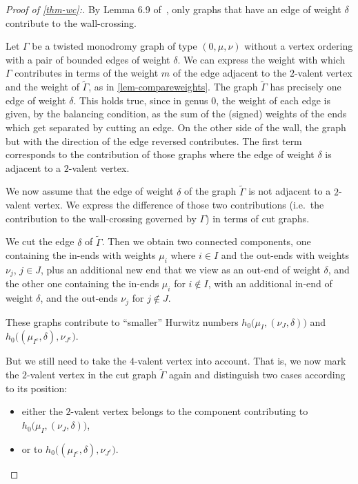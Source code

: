 \documentclass[ALCO,published]{cedram}
\begin{document}
\begin{proof}[Proof of \cref{thm-wc}:]
By Lemma 6.9 of~\cite{CJM10}, only graphs that have an edge of weight $\delta$ contribute to the wall-crossing.

Let $\Gamma$ be a twisted monodromy graph of type $(0,\mu,\nu)$ without a vertex ordering with a pair of bounded edges of weight $\delta$.
We can express the weight with which $\Gamma$ contributes in terms of the weight $m$ of the edge adjacent to the $2$-valent vertex and the weight of $\tilde{\Gamma}$, as in \cref{lem-compareweights}.
The graph $\tilde{\Gamma}$ has precisely one edge of weight $\delta$. This holds true, since in genus $0$, the weight of each edge is given, by the balancing condition, as the sum of the (signed) weights of the ends which get separated by cutting an edge.  
On the other side of the wall, the graph but with the direction of the edge reversed contributes. The first term corresponds to the contribution of those graphs where the edge of weight $\delta$ is adjacent to a $2$-valent vertex. 

We now assume that the edge of weight $\delta$ of the graph $\tilde{\Gamma}$ is not adjacent to a $2$-valent vertex. We express the difference of those two contributions (i.e.\ the contribution to the wall-crossing governed by $\Gamma$) in terms of cut graphs.

We cut the edge $\delta$ of $\tilde{\Gamma}$.
Then we obtain two connected components, one containing the in-ends with weights $\mu_i$ where $i\in I$ and the out-ends with weights $\nu_j$, $j\in J$, plus an additional new end that we view as an out-end of weight $\delta$, and the other one containing the in-ends $\mu_i$ for $i \notin I$, with an additional in-end of weight $\delta$, and the out-ends $\nu_j$ for $j\notin J$.

These graphs contribute to ``smaller'' Hurwitz numbers $h_0\big(\mu_I,(\nu_J,\delta)\big)$ and $h_0\big((\mu_{I^c},\delta),\nu_{J^c}\big)$.

But we still need to take the $4$-valent vertex into account.
That is, we now mark the $2$-valent vertex in the cut graph $\tilde{\Gamma}$ again and
distinguish two cases according to its position:
\begin{itemize}
    \item either the $2$-valent vertex belongs to the component contributing to $h_0\big(\mu_I,(\nu_J,\delta)\big)$, 
    \item or to $h_0\big((\mu_{I^c},\delta),\nu_{J^c}\big)$.
\end{itemize}


\end{proof}
\end{document}
